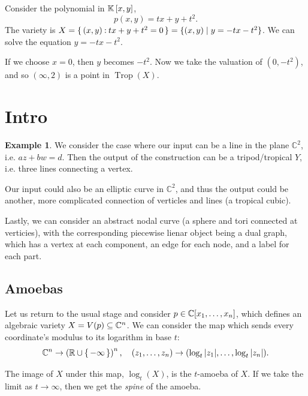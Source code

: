 \documentclass[12pt]{memoir}
\DeclareMathOperator{\Trop}{Trop}
\theoremstyle{definition}
\newtheorem{protoexample}{Example}[section]
\newenvironment{ex}
   {\begin{protoexample}}
   {\end{protoexample}}
\def\CC{{\mathbb C}}
\begin{document}
\begin{Ex}
    Consider the polynomial in $\mathbb{K}\left\lbrack x,y\right\rbrack$,
    $$p(x,y)=tx+y+t^2.$$
    The variety is $X=\{\,(x,y)\mathbin{:} tx+y+t^2=0\,\}=\{ (x,y) \; |\; y = -tx -t^2\}$. We can solve the equation $y=-tx-t^2$.\par 
    If we choose $x=0$, then $y$ becomes $-t^2$. Now we take the valuation of $(0,-t^2)$, and so $(\infty,2)$ is a point in $\Trop(X)$.
\end{Ex}

\section{Intro}



\begin{ex}
    We consider the case where our input can be a line in the plane $\CC^2$, i.e. $az+bw=d$. Then the output of the construction can be a tripod/tropical $Y$, i.e. three lines connecting a vertex.


    Our input could also be an elliptic curve in $\CC^2$, and thus the output could be another, more complicated connection of verticles and lines (a tropical cubic). 


    Lastly, we can consider an abstract nodal curve (a sphere and tori connected at verticies), with the corresponding piecewise lienar object being a dual graph, which has a vertex at each component, an edge for each node, and a label for each part.
\end{ex}


\subsection{Amoebas}


Let us return to the usual stage and consider $p\in\mathbb{C}[x_1,\dots,x_n]$, which defines an algebraic variety $X=V(p)\subseteq\mathbb{C}^n$. We can consider the map which sends every coordinate's modulus to its logarithm in base $t$: 
$$\mathbb{C}^n\to\left(\mathbb{R}\cup\{\,-\infty\,\}\right)^n,\quad (z_1,\dots,z_n)\to(\log_t|z_1|,\dots,\log_t|z_n|).$$


The image of $X$ under this map, $\log_t(X)$, is the $t$-amoeba of $X$. If we take the limit as $t\to\infty$, then we get the \emph{spine} of the amoeba. 
\end{document}
